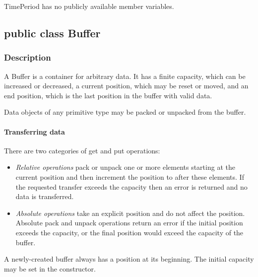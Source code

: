 \documentclass[$Date: 2003/06/26 19:29:31 $]{glabarticle}
\begin{document}
TimePeriod has no publicly available member variables.


\newpage

\subsection{public class Buffer}


\subsubsection{Description}

A Buffer is a container for arbitrary data.  It has a finite capacity,
which can be increased or decreased, a current position, which may be
reset or moved, and an end position, which is the last position in the
buffer with valid data.

Data objects of any primitive type may be packed or unpacked from the
buffer.

\paragraph{Transferring data} 

There are two categories of get and  put operations: 

\begin{itemize}

\item \textit{Relative operations} pack or unpack one or more elements
starting at the current position and then increment the position to
after these elements. If the requested transfer exceeds
the capacity then an error is returned and no data is transferred.
  
\item \textit{Absolute operations} take an explicit position and do
not affect the position. Absolute pack and unpack operations return an
error if the initial position exceeds the capacity, or the final
position would exceed the capacity of the buffer.

\end{itemize}
 
A newly-created buffer always has a position at its beginning.  The initial capacity may be
set in the constructor.
\end{document}
